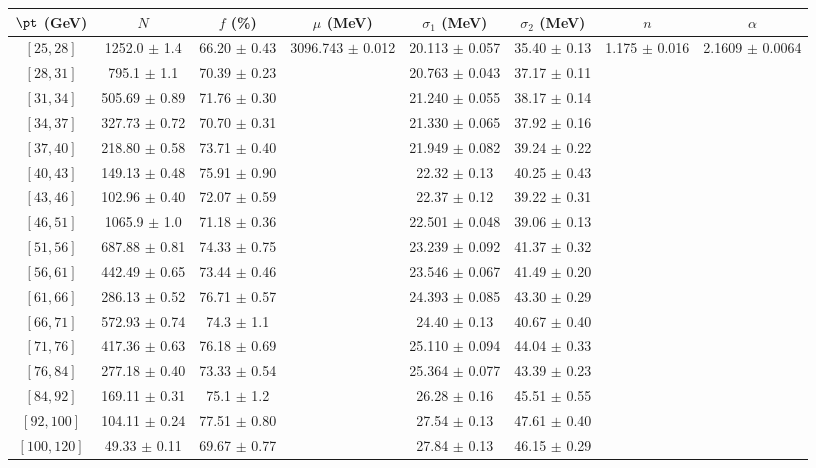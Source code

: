 \begin{tabular}{c||c|c|c|c|c|c|c}
$\pt$ (GeV) & $N$ & $f$ (\%) & $\mu$ (MeV) & $\sigma_1$ (MeV) & $\sigma_2$ (MeV) & $n$ & $\alpha$ \\
\hline
$[25, 28]$ & 1252.0 $\pm$ 1.4 & 66.20 $\pm$ 0.43 & \multirow{17}{*}{3096.743 $\pm$ 0.012} & 20.113 $\pm$ 0.057 & 35.40 $\pm$ 0.13 & \multirow{17}{*}{1.175 $\pm$ 0.016} & \multirow{17}{*}{2.1609 $\pm$ 0.0064}\\
$[28, 31]$ & 795.1 $\pm$ 1.1 & 70.39 $\pm$ 0.23 &  & 20.763 $\pm$ 0.043 & 37.17 $\pm$ 0.11 &  & \\
$[31, 34]$ & 505.69 $\pm$ 0.89 & 71.76 $\pm$ 0.30 &  & 21.240 $\pm$ 0.055 & 38.17 $\pm$ 0.14 &  & \\
$[34, 37]$ & 327.73 $\pm$ 0.72 & 70.70 $\pm$ 0.31 &  & 21.330 $\pm$ 0.065 & 37.92 $\pm$ 0.16 &  & \\
$[37, 40]$ & 218.80 $\pm$ 0.58 & 73.71 $\pm$ 0.40 &  & 21.949 $\pm$ 0.082 & 39.24 $\pm$ 0.22 &  & \\
$[40, 43]$ & 149.13 $\pm$ 0.48 & 75.91 $\pm$ 0.90 &  & 22.32 $\pm$ 0.13 & 40.25 $\pm$ 0.43 &  & \\
$[43, 46]$ & 102.96 $\pm$ 0.40 & 72.07 $\pm$ 0.59 &  & 22.37 $\pm$ 0.12 & 39.22 $\pm$ 0.31 &  & \\
$[46, 51]$ & 1065.9 $\pm$ 1.0 & 71.18 $\pm$ 0.36 &  & 22.501 $\pm$ 0.048 & 39.06 $\pm$ 0.13 &  & \\
$[51, 56]$ & 687.88 $\pm$ 0.81 & 74.33 $\pm$ 0.75 &  & 23.239 $\pm$ 0.092 & 41.37 $\pm$ 0.32 &  & \\
$[56, 61]$ & 442.49 $\pm$ 0.65 & 73.44 $\pm$ 0.46 &  & 23.546 $\pm$ 0.067 & 41.49 $\pm$ 0.20 &  & \\
$[61, 66]$ & 286.13 $\pm$ 0.52 & 76.71 $\pm$ 0.57 &  & 24.393 $\pm$ 0.085 & 43.30 $\pm$ 0.29 &  & \\
$[66, 71]$ & 572.93 $\pm$ 0.74 & 74.3 $\pm$ 1.1 &  & 24.40 $\pm$ 0.13 & 40.67 $\pm$ 0.40 &  & \\
$[71, 76]$ & 417.36 $\pm$ 0.63 & 76.18 $\pm$ 0.69 &  & 25.110 $\pm$ 0.094 & 44.04 $\pm$ 0.33 &  & \\
$[76, 84]$ & 277.18 $\pm$ 0.40 & 73.33 $\pm$ 0.54 &  & 25.364 $\pm$ 0.077 & 43.39 $\pm$ 0.23 &  & \\
$[84, 92]$ & 169.11 $\pm$ 0.31 & 75.1 $\pm$ 1.2 &  & 26.28 $\pm$ 0.16 & 45.51 $\pm$ 0.55 &  & \\
$[92, 100]$ & 104.11 $\pm$ 0.24 & 77.51 $\pm$ 0.80 &  & 27.54 $\pm$ 0.13 & 47.61 $\pm$ 0.40 &  & \\
$[100, 120]$ & 49.33 $\pm$ 0.11 & 69.67 $\pm$ 0.77 &  & 27.84 $\pm$ 0.13 & 46.15 $\pm$ 0.29 &  & \\
\end{tabular}
